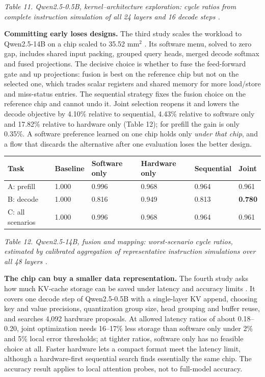 \documentclass[11pt]{article}
\begin{document}
\emph{Table 11. Qwen2.5-0.5B, kernel--architecture exploration: cycle ratios from complete instruction simulation of all 24 layers and 16 decode steps \cite{r97}.}

\textbf{Committing early loses designs.} The third study scales the workload to Qwen2.5-14B on a chip scaled to 35.52 mm\ensuremath{^2} \cite{r98}. Its software menu, solved to zero gap, includes shared input packing, grouped query heads, merged decode softmax and fused projections. The decisive choice is whether to fuse the feed-forward gate and up projections: fusion is best on the reference chip but not on the selected one, which trades scalar registers and shared memory for more load/store and miss-status entries. The sequential strategy fixes the fusion choice on the reference chip and cannot undo it. Joint selection reopens it and lowers the decode objective by 4.10\% relative to sequential, 4.43\% relative to software only and 17.82\% relative to hardware only (Table 12); for prefill the gain is only 0.35\%. A software preference learned on one chip holds only \emph{under that chip}, and a flow that discards the alternative after one evaluation loses the better design.

\begin{longtable}[]{@{}llllll@{}}
\toprule\noalign{}
Task & Baseline & Software only & Hardware only & Sequential & Joint \\
\midrule\noalign{}
\endhead
\bottomrule\noalign{}
\endlastfoot
A: prefill & 1.000 & 0.996 & 0.968 & 0.964 & 0.961 \\
B: decode & 1.000 & 0.816 & 0.949 & 0.813 & \textbf{0.780} \\
C: all scenarios & 1.000 & 0.996 & 0.968 & 0.964 & 0.961 \\
\end{longtable}

\emph{Table 12. Qwen2.5-14B, fusion and mapping: worst-scenario cycle ratios, estimated by calibrated aggregation of representative instruction simulations over all 48 layers \cite{r98}.}

\textbf{The chip can buy a smaller data representation.} The fourth study asks how much KV-cache storage can be saved under latency and accuracy limits \cite{r99}. It covers one decode step of Qwen2.5-0.5B with a single-layer KV append, choosing key and value precisions, quantization group size, head grouping and buffer reuse, and searches 4,092 hardware proposals. At allowed latency ratios of about 0.18--0.20, joint optimization needs 16--17\% less storage than software only under 2\% and 5\% local error thresholds; at tighter ratios, software only has no feasible choice at all. Faster hardware lets a compact format meet the latency limit, although a hardware-first sequential search finds essentially the same chip. The accuracy result applies to local attention probes, not to full-model accuracy.
\end{document}
